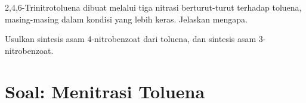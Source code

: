 \begin{exercise}[$\star\star\star$]\label{exo:b2:aromatic-substitution:11}
2,4,6-Trinitrotoluena dibuat melalui tiga nitrasi berturut-turut terhadap
toluena, masing-masing dalam kondisi yang lebih keras. Jelaskan mengapa.
\end{exercise}

\begin{exercise}[$\star\star\star$]\label{exo:b2:aromatic-substitution:12}
Usulkan sintesis asam 4-nitrobenzoat dari toluena, dan sintesis asam 3-nitrobenzoat.
\end{exercise}

\section{Soal: Menitrasi Toluena}

